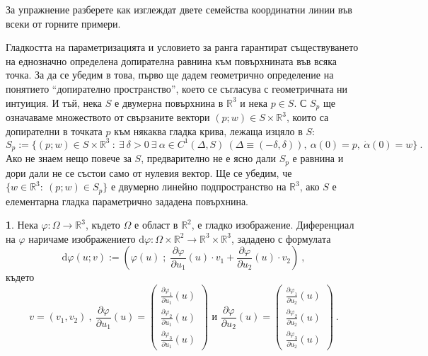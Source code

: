 \documentclass[11pt]{article}
\numberwithin{equation}{section}
\numberwithin{figure}{section}
\numberwithin{table}{section}
\theoremstyle{plain}
\theoremstyle{definition}
\newtheorem{defn}[thm]{\protect\definitionname}
\theoremstyle{remark}
\theoremstyle{definition}
\theoremstyle{remark}
\theoremstyle{plain}
\theoremstyle{definition}
\theoremstyle{definition}
\theoremstyle{plain}
\theoremstyle{plain}
\theoremstyle{plain}
\theoremstyle{definition}
\theoremstyle{plain}
\providecommand{\definitionname}{Дефиниция}
\newcommand*{\R}{\mathbb{R}}
\begin{document}
\bigskip

За упражнение разберете как изглеждат двете семейства координатни линии във всеки от горните примери.

\bigskip

Гладкостта на параметризацията и условието за ранга гарантират съществуването на еднозначно определена допирателна равнина към повърхнината във всяка точка. За да се убедим в това, първо ще дадем геометрично определение на понятието ``допирателно пространство'', което се съгласува с геометричната ни интуиция. И тъй, нека $S$ е двумерна повърхнина в $\R^3$ и нека $p\in S$. С $S_p$ ще означаваме множеството от свързаните вектори $(p;w)\in S\times \R^3$, които са допирателни в точката $p$ към някаква гладка крива, лежаща изцяло в $S$:
$$S_p:=\{(p;w)\in S\times \R^3 \ : \ \exists \ \delta>0 \ \exists \ \alpha \in C^1(\Delta , S) \  (\Delta\equiv (-\delta,\delta)) , \ \alpha(0)=p, \ \dot\alpha(0)=w\} \ .$$
Ако не знаем нещо повече за $S$, предварително не е ясно дали $S_p$ е равнина и дори дали не се състои само от нулевия вектор. Ще се убедим, че $\{ w\in \R^3 : \ (p;w)\in S_p\}$ е двумерно линейно подпространство на $\R^3$, ако $S$ е елементарна гладка параметрично зададена повърхнина.

\begin{defn} Нека $\varphi : \Omega \longrightarrow \R^3$, където $\Omega$ е област в $\R^2$, е гладко изображение. Диференциал на $\varphi$ наричаме изображението $\textrm{d}\varphi:\Omega\times \R^2\longrightarrow \R^3\times \R^3$, зададено с формулата
$$\textrm{d}\varphi (u;v):= \left(\varphi(u)\; ; \;\frac{\partial\varphi}{\partial u_1}(u)\cdot v_1+\frac{\partial\varphi}{\partial u_2}(u)\cdot v_2\right)\ , $$ където $$v=(v_1,v_2) \ , \ \frac{\partial\varphi}{\partial u_1}(u)=\left( \begin{array}{c}\frac{\partial\varphi_1}{\partial u_1}(u)\\ \frac{\partial\varphi_2}{\partial u_1}(u)\\ \frac{\partial\varphi_3}{\partial u_1}(u)\end{array}\right) \mbox{ и } \frac{\partial\varphi}{\partial u_2}(u)=\left( \begin{array}{c}\frac{\partial\varphi_1}{\partial u_2}(u)\\ \frac{\partial\varphi_2}{\partial u_2}(u)\\ \frac{\partial\varphi_3}{\partial u_2}(u)\end{array}\right) \ .$$
\end{defn}
\end{document}

